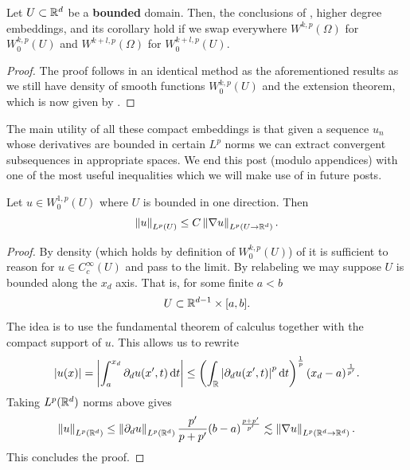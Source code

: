 \documentclass[
    a4paper,
    DIV=14,
    abstract=true,
    numbers=noenddot
]{scrartcl}
\begin{document}
\begin{theorem} 
	Let $U\subset \mathbb{R}^d$ be a \textbf{bounded} domain. Then, the conclusions of , higher degree embeddings, and its corollary hold if we swap everywhere $W^{k,p}(\Omega)$ for $W^{k,p}_0(U)$ and $W^{k+l,p}(\Omega)$ for $W^{k+l,p}_0(U)$.
\end{theorem}
\begin{proof}
	The proof follows in an identical method as the aforementioned results as we still have density of smooth functions $W^{k,p}_0(U)$ and the extension theorem, which is now given by .
\end{proof}





The main utility of all these compact embeddings is that given a sequence $u_n$ whose derivatives are bounded in certain  $L^p$ norms we can extract convergent subsequences in appropriate spaces. We end this post (modulo appendices) with one of the most useful inequalities which we will make use of in future posts.
\begin{theorem}\label{poincare} Let $u \in W^{1,p}_0(U)$ where $U$ is bounded in one direction. Then
	\begin{align*}
		\left\lVert u \right\rVert_{L^p(U)}\leq C\left\lVert \nabla u \right\rVert_{L^p(U \to \mathbb{R}^d)}.
	\end{align*}
\end{theorem}
\begin{proof}
	By density (which holds by definition of $W^{k,p}_0(U)$) of it is sufficient to reason for $u \in C_c^\infty(U)$ and pass to the limit. By relabeling we may suppose $U$ is bounded along the $x_d$ axis. That is, for some finite $a<b$
	\begin{align*}
		U \subset \mathbb{R}^{d-1} \times [a,b].
	\end{align*}
	The idea is to use the fundamental theorem of calculus together with the compact support of $u$. This allows us to rewrite
	\begin{align*}
		{\left| u(x) \right|}= {\left| \int_{a}^{x_d} \partial_d u(x',t) \,\mathrm{d} t \right|} \leq \left(\int_{\mathbb{R}}{\left| \partial _d u(x',t) \right|}^p \,\mathrm{d} t\right)^\frac{1}{p}(x_d-a)^{\frac{1}{p'}}  .
	\end{align*}
	Taking $L^p(\mathbb{R}^d)$ norms above gives
	\begin{align*}
		\left\lVert u \right\rVert_{L^p(\mathbb{R}^d)}\leq \left\lVert \partial _du \right\rVert_{L^p(\mathbb{R}^d)}\frac{p'}{p+p'}(b-a)^{\frac{p+p'}{p'}} \lesssim  \left\lVert \nabla u \right\rVert_{L^p(\mathbb{R}^d \to \mathbb{R}^d)} .
	\end{align*}
	This concludes the proof.    \end{proof}
\end{document}
